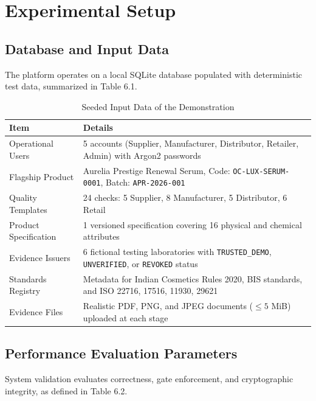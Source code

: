\documentclass[12pt,a4paper]{report}
\begin{document}
\chapter{Experimental Setup}

\section{Database and Input Data}
The platform operates on a local SQLite database populated with deterministic test data, summarized in Table 6.1.

\begin{table}[H]
\centering
\caption{Seeded Input Data of the Demonstration}
\label{tab:seed_data}
\small
\begin{tabularx}{\textwidth}{p{4.0cm} X}
\toprule
\textbf{Item} & \textbf{Details} \\
\midrule
Operational Users & 5 accounts (Supplier, Manufacturer, Distributor, Retailer, Admin) with Argon2 passwords \\
Flagship Product & Aurelia Prestige Renewal Serum, Code: \texttt{OC-LUX-SERUM-0001}, Batch: \texttt{APR-2026-001} \\
Quality Templates & 24 checks: 5 Supplier, 8 Manufacturer, 5 Distributor, 6 Retail \\
Product Specification & 1 versioned specification covering 16 physical and chemical attributes \\
Evidence Issuers & 6 fictional testing laboratories with \texttt{TRUSTED\_DEMO}, \texttt{UNVERIFIED}, or \texttt{REVOKED} status \\
Standards Registry & Metadata for Indian Cosmetics Rules 2020, BIS standards, and ISO 22716, 17516, 11930, 29621 \\
Evidence Files & Realistic PDF, PNG, and JPEG documents ($\le 5$ MiB) uploaded at each stage \\
\bottomrule
\end{tabularx}
\end{table}

\section{Performance Evaluation Parameters}
System validation evaluates correctness, gate enforcement, and cryptographic integrity, as defined in Table 6.2.
\end{document}
